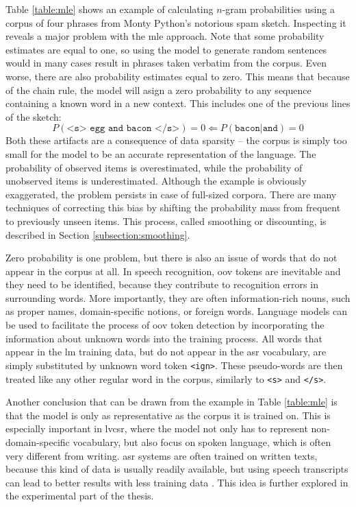 	Table \ref{table:mle} shows an example of calculating $n$-gram probabilities using a corpus of four phrases from Monty Python's notorious spam sketch. Inspecting it reveals a major problem with the \gls{mle} approach. Note that some probability estimates are equal to one, so using the model to generate random sentences would in many cases result in phrases taken verbatim from the corpus. Even worse, there are also probability estimates equal to zero. This means that because of the chain rule, the model will asign a zero probability to any sequence containing a known word in a new context. This includes one of the previous lines of the sketch:
	\begin{equation}
		P(\texttt{<s> egg and bacon </s>})=0 \Leftarrow P(\texttt{bacon}|\texttt{and})=0
	\end{equation}
	Both these artifacts are a consequence of data sparsity -- the corpus is simply too small for the model to be an accurate representation of the language. The probability of observed items is overestimated, while the probability of unobserved items is underestimated. Although the example is obviously exaggerated, the problem persists in case of full-sized corpora. There are many techniques of correcting this bias by shifting the probability mass from frequent to previously unseen items. This process, called smoothing or discounting, is described in Section \ref{subsection:smoothing}. 

	Zero probability is one problem, but there is also an issue of words that do not appear in the corpus at all. In speech recognition, \gls{oov} tokens are inevitable and they need to be identified, because they contribute to recognition errors in surrounding words. More importantly, they are often information-rich nouns, such as proper names, domain-specific notions, or foreign words. Language models can be used to facilitate the process of \gls{oov} token detection by incorporating the information about unknown words into the training process. All words that appear in the \gls{lm} training data, but do not appear in the \gls{asr} vocabulary, are simply substituted by unknown word token \texttt{<ign>}. These pseudo-words are then treated like any other regular word in the corpus, similarly to \texttt{<s>} and \texttt{</s>}. 

	Another conclusion that can be drawn from the example in Table \ref{table:mle} is that the model is only as representative as the corpus it is trained on. This is especially important in \gls{lvcsr}, where the model not only has to represent non-domain-specific vocabulary, but also focus on spoken language, which is often very different from writing. \gls{asr} systems are often trained on written texts, because this kind of data is usually readily available, but using speech transcripts can lead to better results with less training data \cite{dziadzio2015comparison}. This idea is further explored in the experimental part of the thesis.
